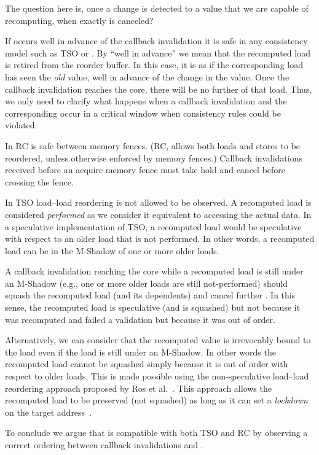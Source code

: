 The question here is, once a change is detected to a value that we are capable of recomputing, when exactly is \recomp canceled? 

If \recomp occurs well in advance of the callback invalidation it is safe in any consistency model such as TSO or \rc. By ``well in advance'' we mean that the recomputed load is retired from the reorder buffer. In this case, it is as if the corresponding load has seen the \emph{old} value, well in advance of the change in the value. Once the callback invalidation reaches the core, there will be no further \recomp of that load.
Thus, we only need to clarify what happens when a callback invalidation and the corresponding \recomp occur in a critical window when consistency rules could be violated.

In RC \recomp is safe between memory fences. (RC, allows both loads and stores to be reordered, unless otherwise enforced by memory fences.) Callback invalidations received before an acquire memory fence must take hold and cancel \recomp before crossing the fence.

In TSO load--load reordering is not allowed to be observed. A recomputed load is considered \emph{performed} as we consider it equivalent to accessing the actual data. In a speculative implementation of TSO,  a recomputed load would be speculative with respect to an older load that is not performed. In other words, a recomputed load can be  in the M-Shadow of one or more older loads.

A callback invalidation reaching the core while a recomputed load is still under an M-Shadow (e.g., one or more older loads are still not-performed) should squash the recomputed load (and its dependents) and cancel further \recomp. In this sense, the recomputed load is speculative (and is squashed) but not because it was recomputed and failed a validation but because it was out of order. 

Alternatively, we can consider that the recomputed value is irrevocably bound to the load even if the load is still under an M-Shadow. In other words the recomputed load cannot be squashed simply because it is out of order with respect to older loads. This is made possible using the non-speculative load--load reordering approach proposed by Ros et al.~\cite{aros-isca17}.  This approach allows the recomputed load to be preserved (not squashed) as long as it can set a \emph{lockdown} on the target address~\cite{aros-isca17}.

To conclude we argue that \recomp is compatible with both TSO and RC by observing a correct ordering between callback invalidations and \recomp.



